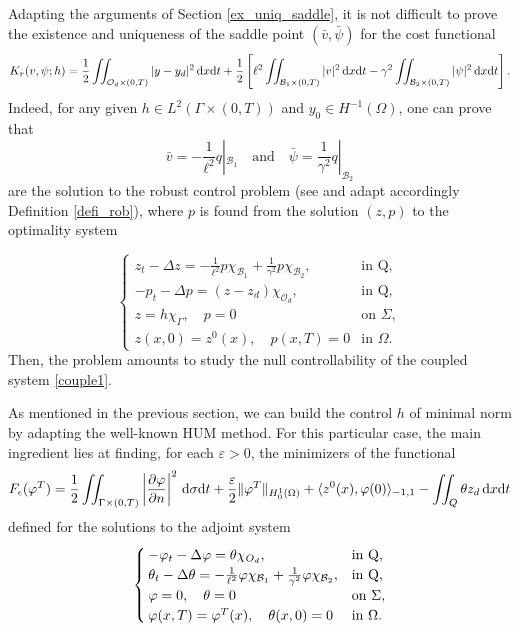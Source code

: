 \documentclass[preprint,10pt]{article}
\numberwithin{equation}{section}
\numberwithin{theorem}{section}
\def\dx{\,\textnormal{d}x}
\def\dt{\textnormal{d}t}
\def\d{\,\textnormal{d}}
\def\cbd{\Gamma}
\newcommand\csin[1]{\chi_{#1}}
\def\dx{\,\textnormal{d}x}
\def\dt{\textnormal{d}t}
\def\d{\,\textnormal{d}}
\begin{document}
{Adapting the arguments of Section \ref{ex_uniq_saddle}, it is not difficult to prove the existence and uniqueness of the saddle point $(\bar v,\bar \psi)$ for the cost functional 
%
\begin{equation*}%
K_r(v,\psi;h)=\frac{1}{2}\iint_{\mathcal O_d\times(0,T)}|y-y_d|^2\dx\dt+\frac{1}{2}\left[\ell^2\iint_{\mathcal B_1\times(0,T)}|v|^2\dx\dt-\gamma^2\iint_{\mathcal B_2\times(0,T)}|\psi|^2\dx\dt\right].
\end{equation*}
%
Indeed, for any given $h\in L^2(\cbd\times(0,T))$ and $y_0\in H^{-1}(\Omega)$, one can prove that
%
\begin{equation*}
\bar v=-\frac{1}{\ell^2}q|_{\mathcal B_1} \quad\text{and}\quad \bar \psi=\frac{1}{\gamma^2}q|_{\mathcal B_2}
\end{equation*}
%
are the solution to the robust control problem (see and adapt accordingly Definition \ref{defi_rob}), where $p$ is found from the solution $(z,p)$ to the optimality system 

\begin{equation}\label{couple1}
\begin{cases}
z_t-\Delta z=-\frac{1}{\ell^2}p\csin{\mathcal B_1}+\frac{1}{\gamma^2}p\csin{\mathcal B_2}, & \text{in Q}, \\
-p_t-\Delta p=(z-z_d)\chi_{\mathcal O_d}, & \text{in Q}, \\
z=h\csin{\Gamma}, \quad p=0 &\text{on } \Sigma, \\
z(x,0)=z^0(x), \quad p(x,T)=0& \text{in } \Omega.
\end{cases}
\end{equation}
%
Then, the problem amounts to study the null controllability of the coupled system \eqref{couple1}. 

As mentioned in the previous section, we can build the control $h$ of minimal norm by adapting the well-known HUM method. For this particular case, the main ingredient lies at finding, for each $\varepsilon>0$, the minimizers of the functional
%
\begin{equation}\label{func_FR}
F_{\epsilon}(\varphi^T)=\frac{1}{2}\iint_{\cbd\times(0,T)}\left|\frac{\partial \varphi}{\partial n}\right|^2\d\sigma\dt+\frac{\varepsilon}{2}\|\varphi^T\|_{H_0^1(\Omega)}+\langle z^0(x),\varphi(0)\rangle_{-1,1}-\iint_{Q}\theta z_d \dx\dt
\end{equation}
%
defined for the solutions to the adjoint system
%
\begin{equation}\label{adjunto1}
\begin{cases}
-\varphi_t-\Delta \varphi=\theta\csin{\mathcal \mathcal O_d}, & \text{in Q}, \\
\theta_t-\Delta \theta=-\frac{1}{\ell^2}\varphi\csin{\mathcal B_1}+\frac{1}{\gamma^2}\varphi \csin{\mathcal B_2}, & \text{in Q}, \\
\varphi=0, \quad \theta=0 &\text{on } \Sigma, \\
\varphi(x,T)=\varphi^T(x), \quad \theta(x,0)=0& \text{in } \Omega.
\end{cases}
\end{equation}

}
\end{document}
